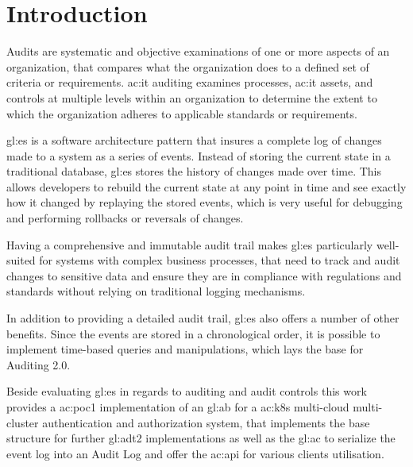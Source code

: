 %
\chapter{Introduction}

Audits are systematic and objective examinations of one or more aspects of an organization, that compares what the organization does to a defined set of criteria or requirements. \gls{ac:it} auditing examines processes, \gls{ac:it} assets, and controls at multiple levels within an organization to determine the extent to which the organization adheres to applicable standards or requirements. 

\gls{gl:es} is a software architecture pattern that insures a complete log of changes made to a system as a series of events. Instead of storing the current state in a traditional database, \gls{gl:es} stores the history of changes made over time. This allows developers to rebuild the current state at any point in time and see exactly how it changed by replaying the stored events, which is very useful for debugging and performing rollbacks or reversals of changes.

Having a comprehensive and immutable audit trail makes \gls{gl:es} particularly well-suited for systems with complex business processes, that need to track and audit changes to sensitive data and ensure they are in compliance with regulations and standards without relying on traditional logging mechanisms.

In addition to providing a detailed audit trail, \gls{gl:es} also offers a number of other benefits. Since the events are stored in a chronological order, it is possible to implement time-based queries and manipulations, which lays the base for Auditing 2.0.

Beside evaluating \gls{gl:es} in regards to auditing and audit controls this work provides a \gls{ac:poc1} implementation of an \gls{gl:ab} for a \gls{ac:k8s} multi-cloud multi-cluster authentication and authorization system, that implements the base structure for further \gls{gl:adt2} implementations as well as the \gls{gl:ac} to serialize the event log into an Audit Log and offer the \gls{ac:api} for various clients utilisation.